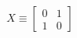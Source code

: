 \documentclass[preview]{standalone}
\begin{document}
\begin{align*}
X \equiv   \begin{bmatrix} 0 & 1 \\ 1 & 0 \end{bmatrix}
\end{align*}
\end{document}

